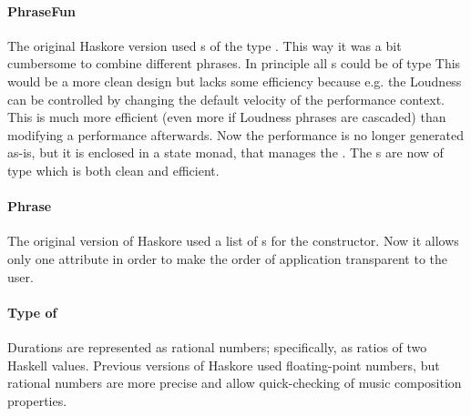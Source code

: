 \paragraph*{PhraseFun}

The original Haskore version used s
of the type .
This way it was a bit cumbersome to combine different phrases.
In principle all s could be of type
This would be a more clean design but lacks some efficiency
because e.g. the Loudness can be controlled
by changing the default velocity of the performance context.
This is much more efficient (even more if Loudness phrases are cascaded)
than modifying a performance afterwards.
Now the performance is no longer generated as-is,
but it is enclosed in a state monad,
that manages the .
The s are now of type
which is both clean and efficient.


\paragraph*{Phrase}


The original version of Haskore used a list of s
for the  constructor.
Now it allows only one attribute
in order to make the order of application transparent to the user.






\paragraph*{Type of }


Durations are represented as rational numbers;
specifically, as ratios of two Haskell  values.
Previous versions of Haskore used floating-point numbers,
but rational numbers are more precise
and allow quick-checking of music composition properties.
